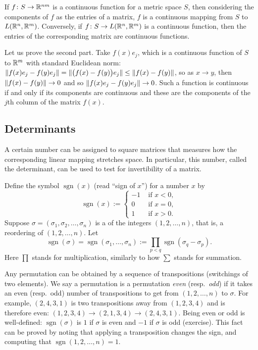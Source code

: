 \begin{prop}
If $f \colon S \to {\mathbb{R}}^{nm}$ is a continuous function
for a metric space $S$,
then considering the components of $f$ as the entries of a matrix,
$f$ is a continuous mapping from $S$
to $L({\mathbb{R}}^n,{\mathbb{R}}^m)$.
Conversely,
if $f \colon S \to L({\mathbb{R}}^n,{\mathbb{R}}^m)$ is a continuous function,
then the entries of the corresponding matrix are continuous functions.
\end{prop}

Let us prove the second part.  Take $f(x) e_j$, which
is a continuous function of $S$ to ${\mathbb{R}}^m$ with standard Euclidean norm:
$\lVert {f(x) e_j - f(y) e_j} \rVert = 
\lVert {\bigl(f(x)- f(y) \bigr) e_j} \rVert \leq
\lVert {f(x)- f(y)} \rVert$, so as $x \to y$, then
$\lVert {f(x)- f(y)} \rVert \to 0$ and so 
$\lVert {f(x) e_j - f(y) e_j} \rVert \to 0$.
Such a
function is continuous if and only if its components are continuous
and these are the components of the $j$th column of the matrix $f(x)$.

\subsection{Determinants}

A certain number can be assigned to square matrices that measures
how the corresponding linear mapping stretches space.  In particular,
this number, called the determinant, can be used to test for invertibility of a matrix.

Define the symbol
$\operatorname{sgn}(x)$ (read ``sign of $x$'') for a number $x$ by
\begin{equation*}
\operatorname{sgn}(x)
:=
\begin{cases}
-1 & \text{ if $x < 0$} , \\
0 & \text{ if $x = 0$} , \\
1 & \text{ if $x > 0$} .
\end{cases}
\end{equation*}
Suppose 
$\sigma = (\sigma_1,\sigma_2,\ldots,\sigma_n)$ is a \emph{}
of the integers $(1,2,\ldots,n)$, that is, a reordering of $(1,2,\ldots,n)$. 
Let
\begin{equation} \label{eq:sgndef}
\operatorname{sgn}(\sigma) = \operatorname{sgn}(\sigma_1,\ldots,\sigma_n) := 
\prod_{p < q} \operatorname{sgn}(\sigma_q-\sigma_p) .
\end{equation}
Here $\prod$ stands for multiplication, similarly to how $\sum$ stands for
summation.

Any permutation can be obtained by
a sequence of transpositions (switchings of two elements).
We say a permutation is
a permutation \emph{even}
(resp.\ \emph{odd})
if it takes an even (resp.\ odd) number of
transpositions to get from $(1,2,\ldots,n)$ to $\sigma$.
For example, $(2,4,3,1)$ is two transpositions away from 
$(1,2,3,4)$ and is therefore even: $(1,2,3,4) \to (2,1,3,4) \to (2,4,3,1)$.
Being even or odd is well-defined:
$\operatorname{sgn}(\sigma)$ 
is $1$ if $\sigma$ is even and $-1$ if $\sigma$ is odd (exercise).
This fact can be proved by noting that applying
a transposition changes the sign, and computing that
$\operatorname{sgn}(1,2,\ldots,n) = 1$.

